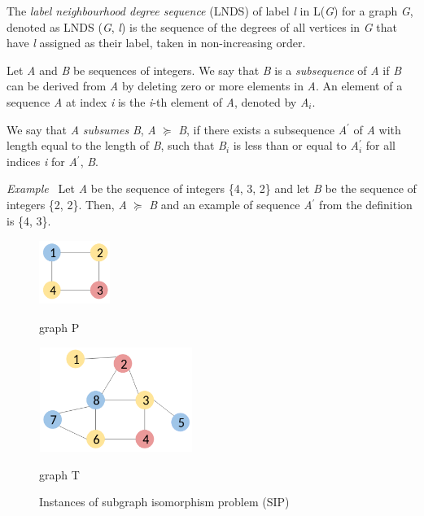 \documentclass{l4proj}
\newcounter{example}[section]
\newenvironment{example}[1][]{\refstepcounter{example}\par\medskip
   \noindent \textit{Example~\theexample #1} \rmfamily}{\medskip}
\begin{document}
The \emph{label neighbourhood degree sequence} (LNDS) of label \emph{l} in L(\emph{G}) for a graph \emph{G}, denoted as LNDS (\emph{G}, \emph{l}) is the sequence of the degrees of all vertices in \emph{G} that have \emph{l} assigned as their label, taken in non-increasing order.

Let \emph{A} and \emph{B} be sequences of integers. We say that \emph{B} is a \emph{subsequence} of \emph{A} if \emph{B} can be derived from \emph{A} by deleting zero or more elements in \emph{A}. An element of a sequence \emph{A} at index \emph{i} is the \emph{i}-th element of \emph{A}, denoted by \emph{A$_{i}$}. 

We say that \emph{A} \emph{subsumes} \emph{B}, \emph{A} $\succeq$ \emph{B}, if there exists a subsequence \emph{A$^\prime$} of \emph{A} with length equal to the length of \emph{B}, such that \emph{B$_{i}$} is less than or equal to \emph{A$_{i}^\prime$} for all indices \emph{i} for \emph{A$^\prime$}, \emph{B}.

\begin{example}
Let \emph{A} be the sequence of integers \{4, 3, 2\} and let \emph{B} be the sequence of integers \{2, 2\}. Then, \emph{A} $\succeq$ \emph{B} and an example of sequence \emph{A$^\prime$} from the definition is \{4, 3\}.
\end{example}

\begin{figure}
\centering
\begin{minipage}[t]{.3\textwidth}
  \centering
  \includegraphics[height=2.1cm,width=2.3cm]{images/graphs/exampleGraph2.png}
  \caption{graph P}
  \label{fig:P}
\end{minipage}%
\begin{minipage}[t]{.4\textwidth}
  \centering
  \includegraphics[height=3.4cm,width=5cm]{images/graphs/exampleGraph.png}
  \caption{graph T}
  \label{fig:T}
\end{minipage}
\caption{Instances of subgraph isomorphism problem (SIP)}
\label{fig:lightFiltersExample}
\end{figure}
\end{document}
